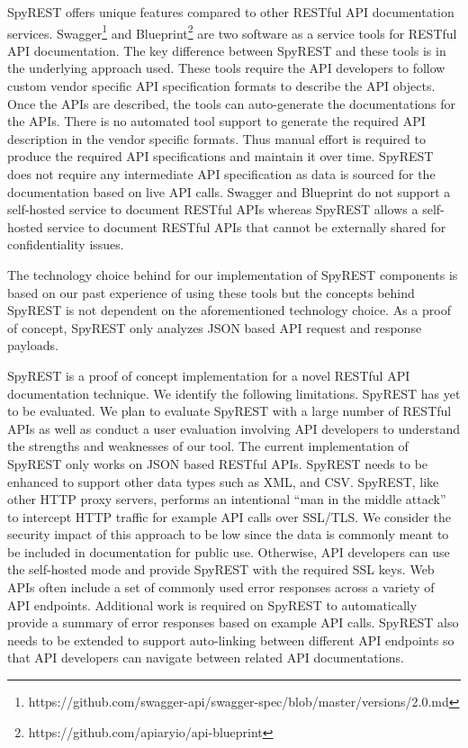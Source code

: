 \documentclass[conference]{IEEEtran}
\begin{document}
SpyREST offers unique features compared to other RESTful API documentation services. Swagger\footnote{https://github.com/swagger-api/swagger-spec/blob/master/versions/2.0.md} and Blueprint\footnote{https://github.com/apiaryio/api-blueprint} are two software as a service tools for RESTful API documentation. The key difference between SpyREST and these tools is in the underlying approach used. These tools require the API developers to follow custom vendor specific API specification formats to describe the API objects. Once the APIs are described, the tools can auto-generate the documentations for the APIs. There is no automated tool support to generate the required API description in the vendor specific formats. Thus manual effort is required to produce the required API specifications and maintain it over time. SpyREST does not require any intermediate API specification as data is sourced for the documentation based on live API calls. Swagger and Blueprint do not support a self-hosted service to document RESTful APIs whereas SpyREST allows a self-hosted service to document RESTful APIs that cannot be externally shared for confidentiality issues.

The technology choice behind for our implementation of SpyREST components is based on our past experience of using these tools but the concepts behind SpyREST is not dependent on the aforementioned technology choice. As a proof of concept, SpyREST only analyzes JSON based API request and response payloads.

SpyREST is a proof of concept implementation for a novel RESTful API documentation technique. We identify the following limitations. SpyREST has yet to be evaluated. We plan to evaluate SpyREST with a large number of RESTful APIs as well as conduct a user evaluation involving API developers to understand the strengths and weaknesses of our tool. The current implementation of SpyREST only works on JSON based RESTful APIs. SpyREST needs to be enhanced to support other data types such as XML, and CSV. SpyREST, like other HTTP proxy servers, performs an intentional ``man in the middle attack'' to intercept HTTP traffic for example API calls over SSL/TLS. We consider the security impact of this approach to be low since the data is commonly meant to be included in documentation for public use. Otherwise, API developers can use the self-hosted mode and provide SpyREST with the required SSL keys. Web APIs often include a set of commonly used error responses across a variety of API endpoints. Additional work is required on SpyREST to automatically provide a summary of error responses based on example API calls. SpyREST also needs to be extended to support auto-linking between different API endpoints so that API developers can navigate between related API documentations.
\end{document}
